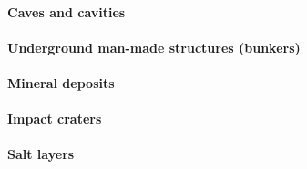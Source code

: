 

\paragraph{Caves and cavities}

\paragraph{Underground man-made structures (bunkers)}

\paragraph{Mineral deposits}

\paragraph{Impact craters}

\paragraph{Salt layers}



